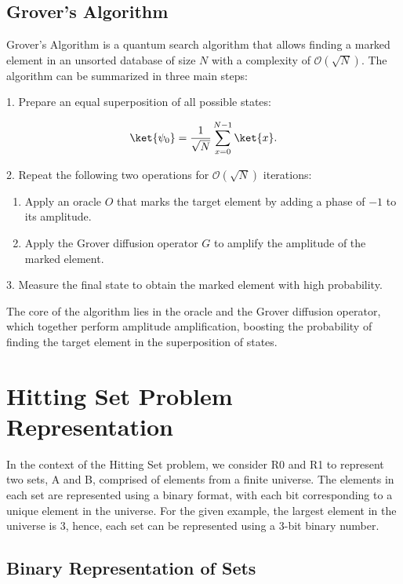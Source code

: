 \subsection{Grover's Algorithm}
Grover's Algorithm is a quantum search algorithm that allows finding a marked element in an unsorted database of size $N$ with a complexity of $\mathcal{O}(\sqrt{N})$. The algorithm can be summarized in three main steps:

1. Prepare an equal superposition of all possible states:

\begin{equation}
\ket{\psi_0} = \frac{1}{\sqrt{N}} \sum_{x=0}^{N-1} \ket{x}.
\end{equation}

2. Repeat the following two operations for $\mathcal{O}(\sqrt{N})$ iterations:

\begin{enumerate}
  \item Apply an oracle $O$ that marks the target element by adding a phase of $-1$ to its amplitude.
  \item Apply the Grover diffusion operator $G$ to amplify the amplitude of the marked element.
\end{enumerate}

3. Measure the final state to obtain the marked element with high probability.

The core of the algorithm lies in the oracle and the Grover diffusion operator, which together perform amplitude amplification, boosting the probability of finding the target element in the superposition of states.

\section{Hitting Set Problem Representation}

In the context of the Hitting Set problem, we consider R0 and R1 to represent two sets, A and B, comprised of elements from a finite universe. The elements in each set are represented using a binary format, with each bit corresponding to a unique element in the universe. For the given example, the largest element in the universe is 3, hence, each set can be represented using a 3-bit binary number.

\subsection{Binary Representation of Sets}

